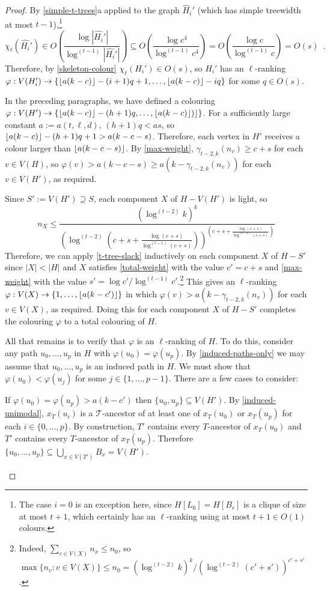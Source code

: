 \documentclass[kpfonts]{patmorin}
\newcommand{\lrn}{\chi_{\ell}}
\theoremstyle{named}
\newcommand{\weirdref}[2]{\cref{#1}#2}
\begin{document}
\begin{proof}
    By \weirdref{simple-t-trees}{a} applied to the graph $\hat{H}_i'$ (which has simple treewidth at most $t-1$),\footnote{The case $i=0$ is an exception here, since $H[L_0]=H[B_r]$ is a clique of size at most $t+1$, which certainly has an $\ell$-ranking using at most $t+1\in O(1)$ colours.}
    \[
       \lrn(\hat{H_i}')\in
       O\left(\frac{\log|\hat{H_i}'|}{\log^{(t-1)}|\hat{H_i}'|}\right)
       \subseteq O\left(\frac{\log c^4}{\log^{(t-1)} c^4}\right)
       = O\left(\frac{\log c}{\log^{(t-1)} c}\right)
       = O(s) \enspace .
    \]
    Therefore, by \cref{skeleton-colour} $\lrn(H_i')\in O(s)$, so
    $H_i'$ has an $\ell$-ranking $\varphi:V(H_i')\to \{{\lfloor a(k-c) \rfloor}-(i+1)q+1,\ldots,\lfloor a(k-c)\rfloor-iq\}$ for some $q\in O(s)$.

    In the preceding paragraphs, we have defined a colouring $\varphi: V(H')\to \{{\lfloor a(k-c) \rfloor}-(h+1)q,\ldots,{\lfloor a(k-c) \rfloor})\rfloor\}$. For a sufficiently large constant $a:=a(t,\ell,d)$, $(h+1)q < as$, so ${\lfloor a(k-c) \rfloor}-(h+1)q+1 > a(k-c-s)$. Therefore, each vertex in $H'$ receives a colour larger than ${\lfloor a(k-c-s) \rfloor}$. By \cref{max-weight}, $\gamma_{t-2,k}(n_v)\ge c+s$ for each $v\in V(H)$, so $\varphi(v)>a(k-c-s) \ge a(k-\gamma_{t-2,k}(n_v))$ for each $v\in V(H')$, as required.

    Since $S':=V(H')\supseteq S$, each component $X$ of $H-V(H')$ is light, so
    \[
       n_{X} \le \frac{(\log^{(t-2)} k)^k}{
        \left(
            \log^{(t-2)}
                \left(
                   c+s+\tfrac{\log(c+s)}{\log^{(t-1)}(c+s)}
               \right)
        \right)^{\left(
           c+s+\tfrac{\log(c+s)}{\log^{(t-1)}(c+s)}
       \right)}
       }
   \]
   Therefore, we can apply \cref{t-tree-slack} inductively on each component $X$ of $H-S'$ since $|X|<|H|$ and $X$ satisfies \cref{total-weight} with the value $c'=c+s$ and \cref{max-weight} with the value $s'=\log c'/\log^{(t-1)} c'$.\footnote{Indeed, $\sum_{v\in V(X)} n_x\le n_0$, so $\max\{n_v:v\in V(X)\}\le n_0= (\log^{(t-2)} k)^k/(\log^{(t-2)}(c'+s'))^{c'+s'}$.}  This gives an $\ell$-ranking $\varphi:V(X)\to\{1,\ldots,{\lfloor a(k-c') \rfloor}\}$ in which $\varphi(v)> a(k-\gamma_{t-2,k}(n_v))$ for each $v\in V(X)$, as required.   Doing this for each component $X$ of $H-S'$ completes the colouring $\varphi$ to a total colouring of $H$.

   All that remains is to verify that $\varphi$ is an $\ell$-ranking of $H$. To do this, consider any path $u_0,\ldots,u_p$ in $H$ with $\varphi(u_0)=\varphi(u_p)$.  By \cref{induced-paths-only} we may assume that $u_0,\ldots,u_p$ is an induced path in $H$.  We must show that $\varphi(u_0)<\varphi(u_j)$ for some $j\in\{1,\ldots,p-1\}$. There are a few cases to consider:
   \begin{compactenum}
        \item If $\varphi(u_0)=\varphi(u_p) > a(k-c')$ then $\{u_0,u_p\}\subseteq V(H')$.  By \cref{induced-unimodal}, $x_T(u_i)$ is a $\mathcal{T}$-ancestor of at least one of $x_T(u_0)$ or $x_T(u_p)$ for each $i\in\{0,\ldots,p\}$.  By construction, $T'$ contains every $T$-ancestor of $x_T(u_0)$ and $T'$ contains every $T$-ancestor of $x_T(u_p)$.  Therefore $\{u_0,\ldots,u_p\}\subseteq \bigcup_{x\in V(T')} B_x=V(H')$.


\end{compactenum}
\end{proof}
\end{document}

